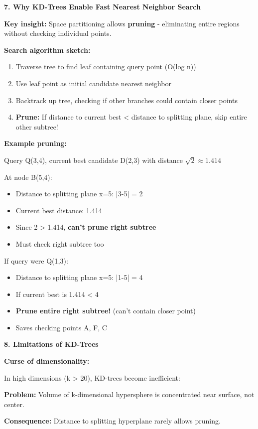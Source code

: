 \documentclass[12pt]{article}
\begin{document}
\begin{explanation}
\textbf{7. Why KD-Trees Enable Fast Nearest Neighbor Search}

\textbf{Key insight:} Space partitioning allows \textbf{pruning} - eliminating entire regions without checking individual points.

\textbf{Search algorithm sketch:}
\begin{enumerate}
    \item Traverse tree to find leaf containing query point (O(log n))
    \item Use leaf point as initial candidate nearest neighbor
    \item Backtrack up tree, checking if other branches could contain closer points
    \item \textbf{Prune:} If distance to current best < distance to splitting plane, skip entire other subtree!
\end{enumerate}

\textbf{Example pruning:}

Query Q(3,4), current best candidate D(2,3) with distance $\sqrt{2} \approx 1.414$

At node B(5,4):
\begin{itemize}
    \item Distance to splitting plane x=5: |3-5| = 2
    \item Current best distance: 1.414
    \item Since 2 > 1.414, \textbf{can't prune right subtree}
    \item Must check right subtree too
\end{itemize}

If query were Q(1,3):
\begin{itemize}
    \item Distance to splitting plane x=5: |1-5| = 4
    \item If current best is 1.414 < 4
    \item \textbf{Prune entire right subtree!} (can't contain closer point)
    \item Saves checking points A, F, C
\end{itemize}

\textbf{8. Limitations of KD-Trees}

\textbf{Curse of dimensionality:}

In high dimensions (k > 20), KD-trees become inefficient:

\textbf{Problem:} Volume of k-dimensional hypersphere is concentrated near surface, not center.

\textbf{Consequence:} Distance to splitting hyperplane rarely allows pruning.


\end{explanation}
\end{document}
